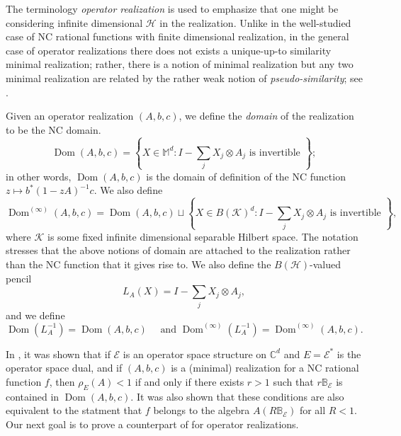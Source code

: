 \documentclass[12pt]{amsart}
\numberwithin{equation}{section}
\theoremstyle{definition}
\newcommand{\cE}{\mathcal{E}}
\newcommand{\cH}{\mathcal{H}}
\newcommand{\cK}{\mathcal{K}}
\newcommand{\bB}{\mathbb{B}}
\newcommand{\bC}{\mathbb{C}}
\newcommand{\bM}{\mathbb{M}}
\newcommand{\dom}{\operatorname{Dom}}
\begin{document}
The terminology {\em operator realization} is used to emphasize that one might be considering infinite dimensional $\cH$ in the realization. 
Unlike in the well-studied case of NC rational functions with finite dimensional realization, in the general case of operator realizations there does not exists a unique-up-to similarity minimal realization; rather, there is a notion of minimal realization but any two minimal realization are related by the rather weak notion of {\em pseudo-similarity}; see \cite[Theorem 3.6]{augat2025operator}. 

Given an operator realization $(A,b,c)$, we define the {\em domain} of the realization to be the NC domain.
\[
\dom(A,b,c) = \left\{X \in \bM^d : I - \sum_j X_j \otimes A_j \textrm{ is invertible } \right\}; 
\]
in other words, $\dom(A,b,c)$ is the domain of definition of the NC function $z \mapsto b^*(1 - z A)^{-1}c$.
We also define 
\[
\dom^{(\infty)}(A,b,c) = \dom(A,b,c) \sqcup \left\{X \in B(\cK)^d : I - \sum_j X_j \otimes A_j \textrm{ is invertible } \right\}, 
\]
where $\cK$ is some fixed infinite dimensional separable Hilbert space. 
The notation stresses that the above notions of domain are attached to the realization rather than the NC function that it gives rise to. We also define the $B(\cH)$-valued pencil 
\[
L_A(X) = I - \sum_j X_j \otimes A_j , 
\]
and we define
\[
\dom(L_A^{-1}) = \dom(A,b,c) \quad \textrm{ and } \dom^{(\infty)}(L_A^{-1}) = \dom^{(\infty)}(A,b,c).
\]


In \cite[Theorem 3.4]{shalsham2025spectral}, it was shown that if $\cE$ is an operator space structure on $\bC^d$ and $E = \cE^*$ is the operator space dual, and if $(A,b,c)$ is a (minimal) realization for a NC rational function $f$, then $\rho_E(A)<1$ if and only if there exists $r>1$ such that $r\bB_\cE$ is contained in $\dom(A,b,c)$. 
It was also shown that these conditions are also equivalent to the statment that $f$ belongs to the algebra $A(R\bB_\cE)$ for all $R<1$. 
Our next goal is to prove a counterpart of \cite[Theorem 3.4]{shalsham2025spectral} for operator realizations. 
\end{document}
